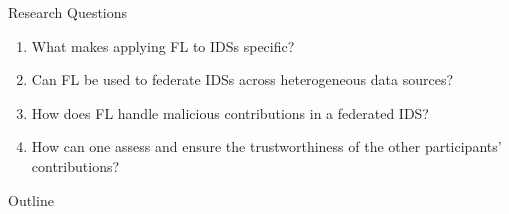 \begin{frame}{Research Questions}
  \begin{enumerate}
    \item What makes applying FL to IDSs specific?
    \item Can FL be used to federate IDSs across heterogeneous data sources?
    \item How does FL handle malicious contributions in a federated IDS?
    \item How can one assess and ensure the trustworthiness of the other participants’ contributions?
  \end{enumerate}
\end{frame}


\begin{frame}{Outline}
  \tableofcontents[hideallsubsections,]
\end{frame}
